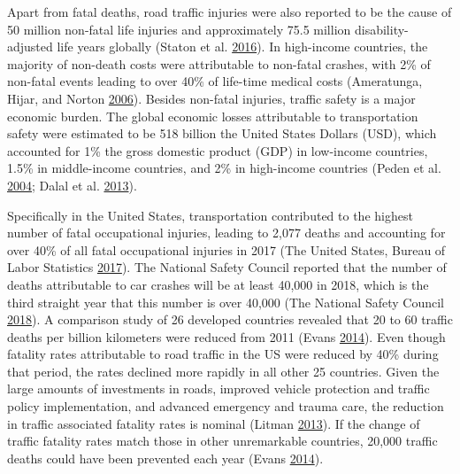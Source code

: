 \documentclass[12pt]{book}
\numberwithin{equation}{chapter}
\begin{document}
Apart from fatal deaths, road traffic injuries were also reported to be the cause of 50 million non-fatal life injuries and approximately 75.5 million disability-adjusted life years globally (Staton et al. \protect\hyperlink{ref-staton2016road}{2016}).
In high-income countries, the majority of non-death costs were attributable to non-fatal crashes, with 2\% of non-fatal events leading to over 40\% of life-time medical costs (Ameratunga, Hijar, and Norton \protect\hyperlink{ref-ameratunga2006road}{2006}).
Besides non-fatal injuries, traffic safety is a major economic burden.
The global economic losses attributable to transportation safety were estimated to be 518 billion the United States Dollars (USD), which accounted for 1\% the gross domestic product (GDP) in low-income countries, 1.5\% in middle-income countries, and 2\% in high-income countries (Peden et al. \protect\hyperlink{ref-peden2004world}{2004}; Dalal et al. \protect\hyperlink{ref-dalal2013economics}{2013}).

Specifically in the United States, transportation contributed to the highest number of fatal occupational injuries, leading to 2,077 deaths and accounting for over 40\% of all fatal occupational injuries in 2017 (The United States, Bureau of Labor Statistics \protect\hyperlink{ref-bols}{2017}).
The National Safety Council reported that the number of deaths attributable to car crashes will be at least 40,000 in 2018, which is the third straight year that this number is over 40,000 (The National Safety Council \protect\hyperlink{ref-nsc2018}{2018}).
A comparison study of 26 developed countries revealed that 20 to 60 traffic deaths per billion kilometers were reduced from 2011 (Evans \protect\hyperlink{ref-evans2014traffic}{2014}).
Even though fatality rates attributable to road traffic in the US were reduced by 40\% during that period, the rates declined more rapidly in all other 25 countries.
Given the large amounts of investments in roads, improved vehicle protection and traffic policy implementation, and advanced emergency and trauma care, the reduction in traffic associated fatality rates is nominal (Litman \protect\hyperlink{ref-litman2013transportation}{2013}).
If the change of traffic fatality rates match those in other unremarkable countries, 20,000 traffic deaths could have been prevented each year (Evans \protect\hyperlink{ref-evans2014traffic}{2014}).
\end{document}
